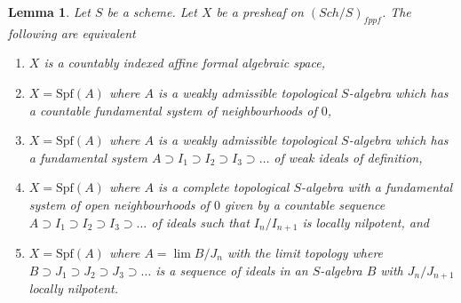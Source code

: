\documentclass{stacks-project}
\theoremstyle{plain}
\newtheorem{lemma}[subsection]{Lemma}
\theoremstyle{definition}
\theoremstyle{remark}
\numberwithin{equation}{subsection}
\def\lim{\mathop{\mathrm{lim}}\nolimits}
\def\Sch{\mathit{Sch}}
\begin{document}
\begin{lemma}
\label{lemma-countably-indexed}
Let $S$ be a scheme. Let $X$ be a presheaf on $(\Sch/S)_{fppf}$.
The following are equivalent
\begin{enumerate}
\item $X$ is a countably indexed affine formal algebraic space,
\item $X = \text{Spf}(A)$ where $A$ is a weakly admissible topological
$S$-algebra which has a countable fundamental system of neighbourhoods of $0$,
\item $X = \text{Spf}(A)$ where $A$ is a weakly admissible topological
$S$-algebra which has a fundamental system
$A \supset I_1 \supset I_2 \supset I_3 \supset \ldots$
of weak ideals of definition,
\item $X = \text{Spf}(A)$ where $A$ is a complete topological $S$-algebra
with a fundamental system of open neighbourhoods of $0$ given by a
countable sequence $A \supset I_1 \supset I_2 \supset I_3 \supset \ldots$
of ideals such that $I_n/I_{n + 1}$ is locally nilpotent, and
\item $X = \text{Spf}(A)$ where $A = \lim B/J_n$ with the limit topology
where $B \supset J_1 \supset J_2 \supset J_3 \supset \ldots$ is a
sequence of ideals in an $S$-algebra $B$ with $J_n/J_{n + 1}$
locally nilpotent.
\end{enumerate}
\end{lemma}
\end{document}
